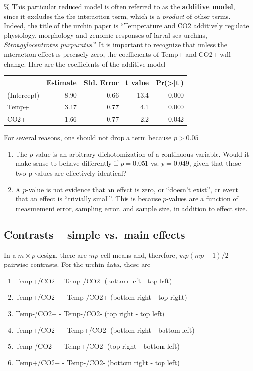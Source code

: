 \documentclass[]{book}
\providecommand{\tightlist}{%
  \setlength{\itemsep}{0pt}\setlength{\parskip}{0pt}}
\begin{document}
\% This particular reduced model is often referred to as the
\textbf{additive model}, since it excludes the the interaction term,
which is a \emph{product} of other terms. Indeed, the title of the
urchin paper is ``Temperature and CO2 additively regulate physiology,
morphology and genomic responses of larval sea urchins,
\emph{Strongylocentrotus purpuratus}.'' It is important to recognize
that unless the interaction effect is precisely zero, the coefficients
of Temp+ and CO2+ will change. Here are the coefficients of the additive
model

\begin{tabular}{l|r|r|r|r}
\hline
  & Estimate & Std. Error & t value & Pr(>|t|)\\
\hline
(Intercept) & 8.90 & 0.66 & 13.4 & 0.000\\
\hline
Temp+ & 3.17 & 0.77 & 4.1 & 0.000\\
\hline
CO2+ & -1.66 & 0.77 & -2.2 & 0.042\\
\hline
\end{tabular}

For several reasons, one should not drop a term because \(p>0.05\).

\begin{enumerate}
\def\labelenumi{\arabic{enumi}.}
\tightlist
\item
  The \(p\)-value is an arbitrary dichotomization of a continuous
  variable. Would it make sense to behave differently if \(p=0.051\) vs.
  \(p=0.049\), given that these two p-values are effectively identical?
\item
  A \(p\)-value is not evidence that an effect is zero, or ``doesn't
  exist'', or event that an effect is ``trivially small''. This is
  because \(p\)-values are a function of measurement error, sampling
  error, and sample size, in addition to effect size.
\end{enumerate}

\subsection{Contrasts -- simple vs.~main
effects}\label{contrasts-simple-vs.main-effects}

In a \(m \times p\) design, there are \(mp\) cell means and, therefore,
\(mp(mp-1)/2\) pairwise contrasts. For the urchin data, these are

\begin{enumerate}
\def\labelenumi{\arabic{enumi}.}
\tightlist
\item
  Temp+/CO2- - Temp-/CO2- (bottom left - top left)
\item
  Temp+/CO2+ - Temp-/CO2+ (bottom right - top right)
\item
  Temp-/CO2+ - Temp-/CO2- (top right - top left)
\item
  Temp+/CO2+ - Temp+/CO2- (bottom right - bottom left)
\item
  Temp-/CO2+ - Temp+/CO2- (top right - bottom left)
\item
  Temp+/CO2+ - Temp-/CO2- (bottom right - top left)
\end{enumerate}
\end{document}
